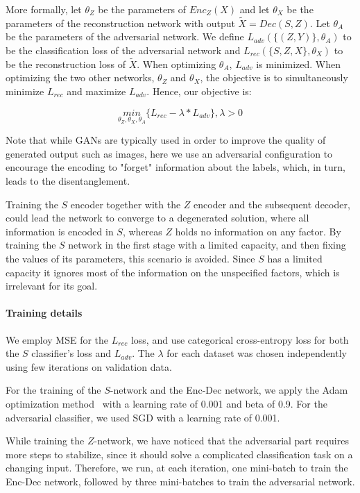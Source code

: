 \documentclass[10pt,twocolumn,letterpaper]{article}
\begin{document}
More formally, let $\theta_Z$ be the parameters of $Enc_Z(X)$ and let $\theta_X$ be the parameters of the reconstruction network with output $\tilde{X} = Dec(S,Z)$. Let $\theta_A$ be the parameters of the adversarial network. We define $L_{adv}(\{(Z,Y)\},\theta_A)$ to be the classification loss of the adversarial network and $L_{rec}(\{S,Z,X\},\theta_X)$ to be the reconstruction loss of $\tilde{X}$. When optimizing $\theta_A$, $L_{adv}$ is minimized. When optimizing the two other networks, $\theta_Z$ and $\theta_X$, the objective is to simultaneously minimize $L_{rec}$ and maximize $L_{adv}$. Hence, our objective is: 

\begin{equation}\label{eqn_loss}
	\underset{\theta_Z,\theta_X,\theta_A}{min} \{L_{rec} - \lambda *L_{adv}\}, \lambda>0
\end{equation}

Note that while GANs are typically used in order to improve the quality of generated output such as images, here we use an adversarial configuration to encourage the encoding to "forget" information about the labels, which, in turn, leads to the disentanglement. 

Training the $S$ encoder together with the $Z$ encoder and the subsequent decoder, could lead the network to converge to a degenerated solution, where all information is encoded in $S$, whereas $Z$ holds no information on any factor. By training the $S$ network in the first stage with a limited capacity, and then fixing the values of its parameters, this scenario is avoided. Since $S$ has a limited capacity it ignores most of the information on the unspecified factors, which is irrelevant for its goal.  
\paragraph{Training details}

We employ MSE for the $L_{rec}$ loss, and use categorical cross-entropy loss for both the $S$ classifier's loss and $L_{adv}$. The $\lambda$ for each dataset was chosen independently using few iterations on validation data. 

For the training of the $S$-network and the Enc-Dec network, we apply the Adam optimization method~\cite{adam} with a learning rate of 0.001 and beta of 0.9. For the adversarial classifier, we used SGD with a learning rate of 0.001. 

While training the $Z$-network, we have noticed that the adversarial part requires more steps to stabilize, since it should solve a complicated classification task on a changing input. %
Therefore, we run, at each iteration, one mini-batch to train the Enc-Dec network, followed by three mini-batches to train the adversarial network. 
\end{document}
